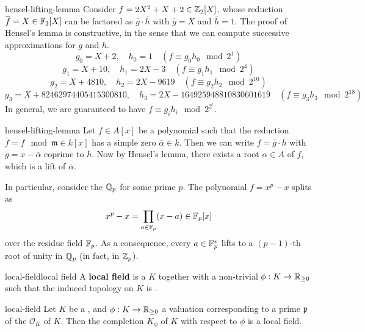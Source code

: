 \begin{example}{hensel-lifting-lemma}
    Consider $f = 2X^2 + X + 2 \in \mathbb{Z}_2[X]$, whose reduction $\overline{f} = X \in \mathbb{F}_2[X]$ can be factored as $\overline{g} \cdot \overline{h}$ with $\overline{g} = X$ and $\overline{h} = 1$. The proof of Hensel's lemma is constructive, in the sense that we can compute successive approximations for $g$ and $h$.
    \[ g_0 = X + 2, \quad h_0 = 1 \quad (f \equiv g_0 h_0 \mod 2^1) \]
    \[ g_1 = X + 10, \quad h_1 = 2X - 3 \quad (f \equiv g_1 h_1 \mod 2^4) \]
    \[ g_2 = X + 4810, \quad h_2 = 2X - 9619 \quad (f \equiv g_2 h_2 \mod 2^{10}) \]
    \[ g_3 = X + 82462974405415300810, \quad h_3 = 2X - 164925948810830601619 \quad (f \equiv g_3 h_3 \mod 2^{18}) \]
    In general, we are guaranteed to have $f \equiv g_i h_i \mod 2^{2^i}$.
\end{example}

\begin{example}{hensel-lifting-lemma}
    Let $f \in A[x]$ be a polynomial such that the reduction $\overline{f} = f \mod \mathfrak{m} \in k[x]$ has a simple zero $\overline{\alpha} \in k$. Then we can write $\overline{f} = \overline{g} \cdot \overline{h}$ with $\overline{g} = x - \overline{\alpha}$ coprime to $\overline{h}$. Now by Hensel's lemma, there exists a root $\alpha \in A$ of $f$, which is a lift of $\overline{\alpha}$.
    
    In particular, consider the  $\mathbb{Q}_p$ for some prime $p$. The polynomial $f = x^p - x$ splits as
    \[ x^p - x = \prod_{a \in \mathbb{F}_p} (x - a) \in \mathbb{F}_p[x] \]
    over the residue field $\mathbb{F}_p$. As a consequence, every $a \in \mathbb{F}_p^*$ lifts to a $(p - 1)$-th root of unity in $\mathbb{Q}_p$ (in fact, in $\mathbb{Z}_p$).
\end{example}

\begin{topic}{local-field}{local field}
    A \textbf{local field} is a  $K$ together with a non-trivial  $\phi : K \to \mathbb{R}_{\ge 0}$ such that the induced topology on $K$ is .
\end{topic}

\begin{example}{local-field}
    Let $K$ be a , and $\phi : K \to \mathbb{R}_{\ge 0}$ a valuation corresponding to a prime $\mathfrak{p}$ of the  $\mathcal{O}_K$ of $K$. Then the completion $K_\phi$ of $K$ with respect to $\phi$ is a local field.
\end{example}

